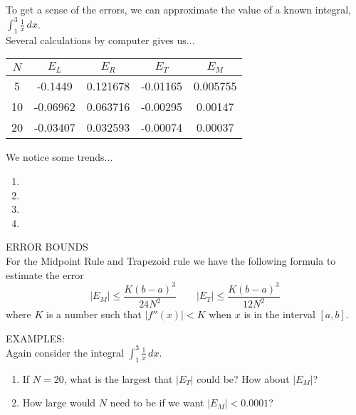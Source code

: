 \documentclass[11pt]{article}
\begin{document}
\pagebreak

To get a sense of the errors, we can approximate the value of a known integral, $\int_1^3\frac{1}{x} \, dx$.\\

Several calculations by computer gives us...\\

\vspace{0.3cm}

\begin{tabular}{|c|c|c|c|c|}\hline
$N$ & $E_L$ & $E_R$ & $E_T$ & $E_M$\\
\hline
5 & -0.1449 & 0.121678 & -0.01165 & 0.005755 \\
10 & -0.06962 & 0.063716 & -0.00295 & 0.00147 \\
20 & -0.03407 & 0.032593 & -0.00074 & 0.00037 \\
\hline
\end{tabular}
\vspace{0.2in}

We notice some trends...

\begin{enumerate}
\item{}
\item{}
\item{}
\item{}
  \end{enumerate}

\vspace{0.2in}

ERROR BOUNDS\\

For the Midpoint Rule and Trapezoid rule we have the following formula to estimate the error
\begin{displaymath}
|E_M| \leq \frac{K(b-a)^3}{24N^2} \quad\quad |E_T| \leq \frac{K(b-a)^3}{12N^2}
\end{displaymath}
where $K$ is a number such that $|f''(x)| < K$ when $x$ is in the interval $[a,b]$.

\vspace{0.3cm}

EXAMPLES:\\

Again consider the integral  $\int_1^3\frac{1}{x} \, dx$.

\begin{enumerate}
\item{If $N=20$, what is the largest that $|E_T|$ could be?  How about $|E_M|$?}
  \item{How large would $N$ need to be if we want $|E_M|< 0.0001$?}
  \end{enumerate}
\end{document}

